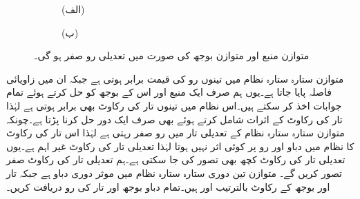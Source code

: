 \begin{figure}
\centering
\begin{subfigure}{0.5\textwidth}
\centering
{}
\caption*{(الف)}
\end{subfigure}%
\begin{subfigure}{0.5\textwidth}
\centering
{}
\caption*{(ب)}
\end{subfigure}
\caption{متوازن منبع اور متوازن بوجھ کی صورت میں تعدیلی رو صفر  ہو گی۔}
\label{شکل_تین_دوری_تعدیلی_رو_صفر}
\end{figure}

متوازن ستارہ ستارہ نظام میں تینوں رو کی قیمت برابر ہوتی ہے جبکہ ان میں زاویائی فاصلہ  پایا جاتا ہے۔یوں ہم صرف ایک منبع اور اس کے بوجھ کو حل کرتے ہوئے تمام جوابات اخذ کر سکتے ہیں۔اس نظام میں تینوں تار کی رکاوٹ بھی برابر ہوتی ہے لہٰذا تار کی رکاوٹ کے اثرات شامل کرتے ہوئے بھی صرف ایک دور حل کرنا پڑتا ہے۔چونکہ متوازن ستارہ ستارہ نظام کے تعدیلی تار میں رو صفر رہتی ہے لہٰذا اس تار کی رکاوٹ کا نظام میں دباو اور رو پر کوئی اثر نہیں ہوتا لہٰذا تعدیلی تار کی رکاوٹ غیر اہم ہے۔یوں تعدیلی تار کی رکاوٹ کچھ بھی تصور کی جا سکتی ہے۔ہم تعدیلی تار کی رکاوٹ صفر تصور کریں گے۔
متوازن تین دوری ستارہ ستارہ  نظام میں موثر دوری دباو  ہے جبکہ تار اور بوجھ کے رکاوٹ بالترتیب  اور   ہیں۔تمام دباو بوجھ اور تار کی رو دریافت کریں۔

